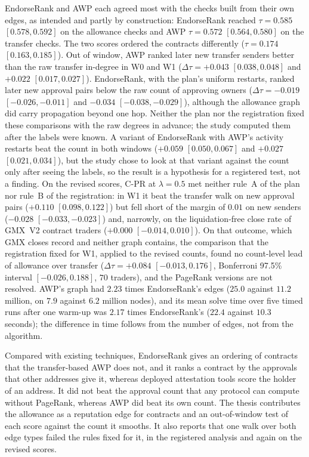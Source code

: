 EndorseRank and AWP each agreed most with the checks built from their own edges, as intended and partly by construction: EndorseRank reached $\tau=0.585$ $[0.578, 0.592]$ on the allowance checks and AWP $\tau=0.572$ $[0.564, 0.580]$ on the transfer checks. The two scores ordered the contracts differently ($\tau=0.174$ $[0.163, 0.185]$). Out of window, AWP ranked later new transfer senders better than the raw transfer in-degree in W0 and W1 ($\Delta\tau=+0.043$ $[0.038, 0.048]$ and $+0.022$ $[0.017, 0.027]$). EndorseRank, with the plan's uniform restarts, ranked later new approval pairs below the raw count of approving owners ($\Delta\tau=-0.019$ $[-0.026, -0.011]$ and $-0.034$ $[-0.038, -0.029]$), although the allowance graph did carry propagation beyond one hop. Neither the plan nor the registration fixed these comparisons with the raw degrees in advance; the study computed them after the labels were known. A variant of EndorseRank with AWP's activity restarts beat the count in both windows ($+0.059$ $[0.050, 0.067]$ and $+0.027$ $[0.021, 0.034]$), but the study chose to look at that variant against the count only after seeing the labels, so the result is a hypothesis for a registered test, not a finding. On the revised scores, C-PR at $\lambda=0.5$ met neither rule~A of the plan nor rule~B of the registration: in W1 it beat the transfer walk on new approval pairs ($+0.110$ $[0.098, 0.122]$) but fell short of the margin of $0.01$ on new senders ($-0.028$ $[-0.033, -0.023]$) and, narrowly, on the liquidation-free close rate of GMX~V2 contract traders ($+0.000$ $[-0.014, 0.010]$). On that outcome, which GMX closes record and neither graph contains, the comparison that the registration fixed for W1, applied to the revised counts, found no count-level lead of allowance over transfer ($\Delta\tau=+0.084$ $[-0.013, 0.176]$, Bonferroni 97.5\% interval $[-0.026, 0.188]$, $70$ traders), and the PageRank versions are not resolved. AWP's graph had $2.23$ times EndorseRank's edges ($25.0$ against $11.2$ million, on $7.9$ against $6.2$ million nodes), and its mean solve time over five timed runs after one warm-up was $2.17$ times EndorseRank's ($22.4$ against $10.3$ seconds); the difference in time follows from the number of edges, not from the algorithm.

Compared with existing techniques, EndorseRank gives an ordering of contracts that the transfer-based AWP does not, and it ranks a contract by the approvals that other addresses give it, whereas deployed attestation tools score the holder of an address. It did not beat the approval count that any protocol can compute without PageRank, whereas AWP did beat its own count. The thesis contributes the allowance as a reputation edge for contracts and an out-of-window test of each score against the count it smooths. It also reports that one walk over both edge types failed the rules fixed for it, in the registered analysis and again on the revised scores.

